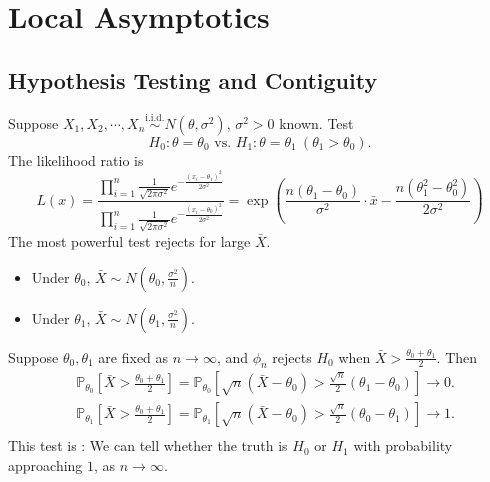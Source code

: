 \documentclass[a4paper]{article}
\begin{document}
\section{Local Asymptotics}

\subsection{Hypothesis Testing and Contiguity}

\begin{eg}
	Suppose $X_1,X_2,\cdots,X_n \stackrel{\text{i.i.d.}}{\sim} N(\theta,\sigma^2)$, $\sigma^2 > 0$ known. Test
	\begin{equation*}
		H_0: \theta = \theta_0 \text{ vs. } H_1: \theta = \theta_1 \ (\theta_1 > \theta_0).
	\end{equation*}
	The likelihood ratio is
	\begin{equation*}
		L(x) = \frac{\prod\limits_{i=1}^n \frac{1}{\sqrt{2\pi \sigma^2}} e^{-\frac{(x_i - \theta_1)^2}{2\sigma^2}}}{\prod\limits_{i=1}^n \frac{1}{\sqrt{2\pi \sigma^2}} e^{-\frac{(x_i - \theta_0)^2}{2\sigma^2}}} = \exp(\frac{n(\theta_1-\theta_0)}{\sigma^2} \cdot \bar{x} - \frac{n(\theta_1^2-\theta_0^2)}{2\sigma^2})
	\end{equation*}
	The most powerful test rejects for large $\bar{X}$.
	\begin{itemize}
		\item Under $\theta_0$, $\bar{X} \sim N(\theta_0,\frac{\sigma^2}{n})$.
		\item Under $\theta_1$, $\bar{X} \sim N(\theta_1,\frac{\sigma^2}{n})$.
	\end{itemize}
	Suppose $\theta_0,\theta_1$ are fixed as $n \to \infty$, and $\phi_n$ rejects $H_0$ when $\bar{X} > \frac{\theta_0+\theta_1}{2}$. Then
	\begin{equation*}
		\begin{aligned}
			& \mathbb{P}_{\theta_0}\left[\bar{X} > \frac{\theta_0+\theta_1}{2}\right] = \mathbb{P}_{\theta_0} \left[\sqrt{n}(\bar{X} - \theta_0) > \frac{\sqrt{n}}{2} (\theta_1 - \theta_0)\right] \to 0. \\
			& \mathbb{P}_{\theta_1}\left[\bar{X} > \frac{\theta_0+\theta_1}{2}\right] = \mathbb{P}_{\theta_1} \left[\sqrt{n}(\bar{X} - \theta_0) > \frac{\sqrt{n}}{2} (\theta_0 - \theta_1)\right] \to 1. \\
		\end{aligned}
	\end{equation*}
	This test is : We can tell whether the truth is $H_0$ or $H_1$ with probability approaching $1$, as $n \to \infty$.
\end{eg}
\end{document}
